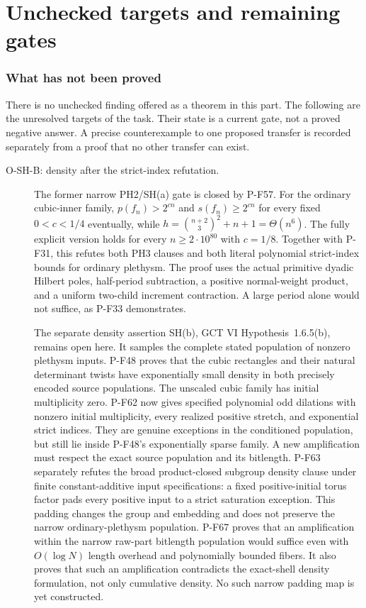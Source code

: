 \part{Unchecked targets and remaining gates}
\label{part:open}
\section{What has not been proved}
There is no unchecked finding offered as a theorem in this part. The
following are the unresolved targets of the task. Their state is a
current gate, not a proved negative answer. A precise counterexample to
one proposed transfer is recorded separately from a proof that no other
transfer can exist.

\begin{description}
\item[O-SH-B: density after the strict-index refutation.]
The former narrow PH2/SH(a) gate is closed by P-F57.
For the ordinary cubic-inner family, $p(f_n)>2^{cn}$ and
$s(f_n)\ge2^{cn}$ for every fixed $0<c<1/4$ eventually,
while $h=\binom{n+2}{3}^2+n+1=\Theta(n^6)$.
The fully explicit version holds for every
$n\ge2\cdot10^{80}$ with $c=1/8$.
Together with P-F31, this refutes both PH3 clauses and both
literal polynomial strict-index bounds for ordinary plethysm.
The proof uses the actual primitive dyadic Hilbert poles,
half-period subtraction, a positive normal-weight product,
and a uniform two-child increment contraction. A large
period alone would not suffice, as P-F33 demonstrates.

The separate density assertion SH(b), GCT VI
Hypothesis~1.6.5(b), remains open here. It samples the
complete stated population of nonzero plethysm inputs.
P-F48 proves that the cubic rectangles and their natural
determinant twists have exponentially small density in
both precisely encoded source populations. The unscaled
cubic family has initial multiplicity zero.  P-F62 now gives
specified polynomial odd dilations with nonzero initial
multiplicity, every realized positive stretch, and exponential
strict indices.  They are genuine exceptions in the conditioned
population, but still lie inside P-F48's exponentially sparse
family.  A new amplification must respect the exact source
population and its bitlength.
P-F63 separately refutes the broad product-closed subgroup density
clause under finite constant-additive input specifications: a fixed
positive-initial torus factor pads every positive input to a strict
saturation exception.  This padding changes the group and embedding
and does not preserve the narrow ordinary-plethysm population.
P-F67 proves that an amplification within the narrow raw-part
bitlength population would suffice even with $O(\log N)$ length
overhead and polynomially bounded fibers.  It also proves that such
an amplification contradicts the exact-shell density formulation,
not only cumulative density.  No such narrow padding map is yet
constructed.


\end{description}
